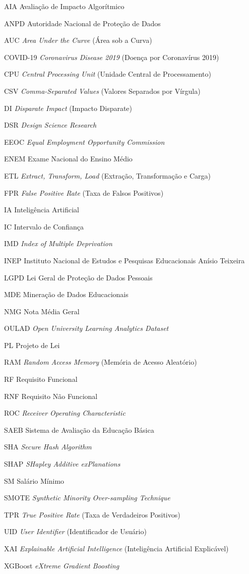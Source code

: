\begin{siglas}
  \item[AIA] Avaliação de Impacto Algorítmico
  \item[ANPD] Autoridade Nacional de Proteção de Dados
  \item[AUC] \textit{Area Under the Curve} (Área sob a Curva)
  \item[COVID-19] \textit{Coronavirus Disease 2019} (Doença por Coronavírus 2019)
  \item[CPU] \textit{Central Processing Unit} (Unidade Central de Processamento)
  \item[CSV] \textit{Comma-Separated Values} (Valores Separados por Vírgula)
  \item[DI] \textit{Disparate Impact} (Impacto Disparate)
  \item[DSR] \textit{Design Science Research}
  \item[EEOC] \textit{Equal Employment Opportunity Commission}
  \item[ENEM] Exame Nacional do Ensino Médio
  \item[ETL] \textit{Extract, Transform, Load} (Extração, Transformação e Carga)
  \item[FPR] \textit{False Positive Rate} (Taxa de Falsos Positivos)
  \item[IA] Inteligência Artificial
  \item[IC] Intervalo de Confiança
  \item[IMD] \textit{Index of Multiple Deprivation}
  \item[INEP] Instituto Nacional de Estudos e Pesquisas Educacionais Anísio Teixeira
  \item[LGPD] Lei Geral de Proteção de Dados Pessoais
  \item[MDE] Mineração de Dados Educacionais
  \item[NMG] Nota Média Geral
  \item[OULAD] \textit{Open University Learning Analytics Dataset}
  \item[PL] Projeto de Lei
  \item[RAM] \textit{Random Access Memory} (Memória de Acesso Aleatório)
  \item[RF] Requisito Funcional
  \item[RNF] Requisito Não Funcional
  \item[ROC] \textit{Receiver Operating Characteristic}
  \item[SAEB] Sistema de Avaliação da Educação Básica
  \item[SHA] \textit{Secure Hash Algorithm}
  \item[SHAP] \textit{SHapley Additive exPlanations}
  \item[SM] Salário Mínimo
  \item[SMOTE] \textit{Synthetic Minority Over-sampling Technique}
  \item[TPR] \textit{True Positive Rate} (Taxa de Verdadeiros Positivos)
  \item[UID] \textit{User Identifier} (Identificador de Usuário)
  \item[XAI] \textit{Explainable Artificial Intelligence} (Inteligência Artificial Explicável)
  \item[XGBoost] \textit{eXtreme Gradient Boosting}
\end{siglas}
